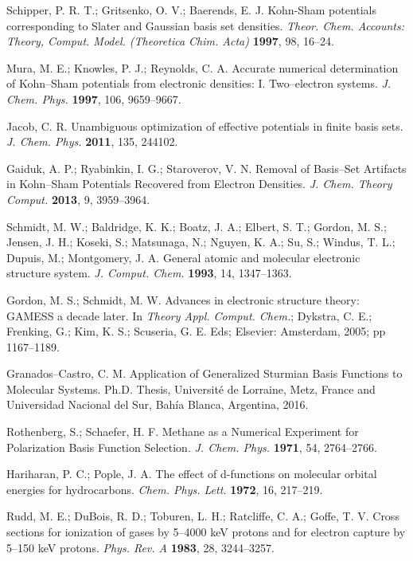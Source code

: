 \documentclass[10pt]{article}
\begin{document}
\begin{thebibliography}{10}
Schipper, P. R. T.; Gritsenko, O. V.; Baerends, E. J. 
Kohn-Sham potentials corresponding to Slater and Gaussian basis set densities.
{\it Theor. Chem. Accounts: Theory, Comput. Model. (Theoretica Chim. Acta)} {\bf 1997}, 98, 16--24.

Mura, M. E.; Knowles, P. J.; Reynolds, C. A.
Accurate numerical determination of Kohn--Sham potentials from electronic densities: I. Two--electron systems.
{\it J. Chem. Phys.} {\bf 1997}, 106, 9659--9667.

Jacob, C. R. 
Unambiguous optimization of effective potentials in finite basis sets.
{\it J. Chem. Phys.} {\bf 2011}, 135, 244102.

Gaiduk, A. P.; Ryabinkin, I. G.; Staroverov, V. N.
Removal of Basis--Set Artifacts in Kohn--Sham Potentials Recovered from Electron Densities.
{\it J. Chem. Theory Comput.} {\bf 2013}, 9, 3959--3964.

Schmidt, M. W.; Baldridge, K. K.; Boatz, J. A.; Elbert, S. T.; Gordon, M. S.; Jensen, J. H.; Koseki, S.;
Matsunaga, N.; Nguyen, K. A.; Su, S.; Windus, T. L.; Dupuis, M.; Montgomery, J. A.
General atomic and molecular electronic structure system.
{\it J. Comput. Chem.} {\bf 1993}, 14, 1347--1363.

Gordon, M. S.; Schmidt, M. W.
Advances in electronic structure theory: GAMESS a decade later. 
In {\it Theory Appl. Comput. Chem.}; 
Dykstra, C. E.; Frenking, G.; Kim, K. S.; Scuseria, G. E. Eds;
Elsevier: Amsterdam, 2005; pp 1167--1189.

Granados--Castro, C. M.
Application of Generalized Sturmian Basis Functions to Molecular Systems.
Ph.D. Thesis, Université de Lorraine, Metz, France and 
Universidad Nacional del Sur, Bahía Blanca, Argentina, 2016.

Rothenberg, S.; Schaefer, H. F.
Methane as a Numerical Experiment for Polarization Basis Function Selection.
{\it J. Chem. Phys.} {\bf 1971}, 54, 2764--2766.

Hariharan, P. C.; Pople, J. A.
The effect of d-functions on molecular orbital energies for hydrocarbons.
{\it Chem. Phys. Lett.} {\bf 1972}, 16, 217--219.

Rudd, M. E.; DuBois, R. D.; Toburen, L. H.; Ratcliffe, C. A.; Goffe, T. V.
Cross sections for ionization of gases by 5--4000 keV protons and for electron capture by 5--150 keV protons.
{\it Phys. Rev. A} {\bf 1983}, 28, 3244--3257.


\end{thebibliography}
\end{document}
